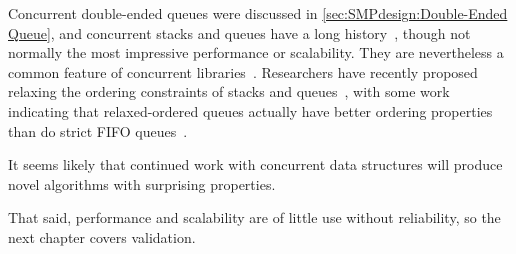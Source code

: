 Concurrent double-ended queues were discussed in
\cref{sec:SMPdesign:Double-Ended Queue},
and concurrent stacks and queues have a long history~\cite{Treiber86},
though not normally the most impressive performance or scalability.
They are nevertheless a common feature of concurrent
libraries~\cite{PaulMcKenney2013LWNURCUqueuestack}.
Researchers have recently proposed relaxing the ordering constraints
of stacks and queues~\cite{Shavit:2011:DSM:1897852.1897873},
with some work indicating that relaxed-ordered queues actually have
better ordering properties than do strict FIFO
queues~\cite{AndreasHaas2012FIFOisnt,ChristophMKirsch2012FIFOisntTR,AndreasHaas2013CFRelaxedQueues}.

It seems likely that continued work with concurrent data structures will
produce novel algorithms with surprising properties.

That said, performance and scalability are of little use without reliability,
so the next chapter covers validation.


